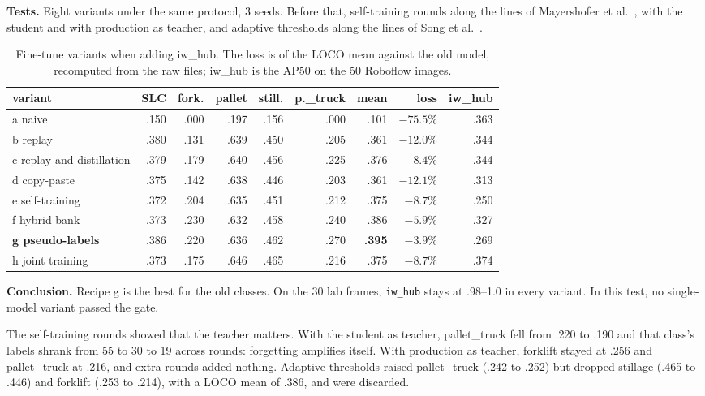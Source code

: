 \documentclass[11pt,a4paper]{article}
\newcommand{\tests}{\noindent\textbf{Tests.} }
\newcommand{\conclusion}{\noindent\textbf{Conclusion.} }
\begin{document}
\tests Eight variants under the same protocol, 3 seeds. Before that,
self-training rounds along the lines of Mayershofer et al.~\cite{selftraining},
with the student and with production as teacher, and adaptive thresholds along the
lines of Song et al.~\cite{apple}.

\begin{table}[H]
\centering\small
\caption{Fine-tune variants when adding iw\_hub. The loss is of the LOCO mean
against the old model, recomputed from the raw files; iw\_hub is the AP50 on the 50
Roboflow images.}
\label{tab:baselines}
\setlength{\tabcolsep}{4pt}
\begin{tabular}{lrrrrrrrr}
\toprule
variant & SLC & fork. & pallet & still. & p.\_truck & mean & loss & iw\_hub \\
\midrule
a naive & .150 & .000 & .197 & .156 & .000 & .101 & $-75.5\%$ & .363 \\
b replay & .380 & .131 & .639 & .450 & .205 & .361 & $-12.0\%$ & .344 \\
c replay and distillation & .379 & .179 & .640 & .456 & .225 & .376 & $-8.4\%$ & .344 \\
d copy-paste & .375 & .142 & .638 & .446 & .203 & .361 & $-12.1\%$ & .313 \\
e self-training & .372 & .204 & .635 & .451 & .212 & .375 & $-8.7\%$ & .250 \\
f hybrid bank & .373 & .230 & .632 & .458 & .240 & .386 & $-5.9\%$ & .327 \\
\textbf{g pseudo-labels} & .386 & .220 & .636 & .462 & .270 & \textbf{.395} & $\mathbf{-3.9\%}$ & .269 \\
h joint training & .373 & .175 & .646 & .465 & .216 & .375 & $-8.7\%$ & .374 \\
\bottomrule
\end{tabular}
\end{table}

\conclusion Recipe g is the best for the old classes. On the 30 lab frames,
\texttt{iw\_hub} stays at .98--1.0 in every variant. In this test, no single-model
variant passed the gate.

The self-training rounds showed that the teacher matters. With the student as
teacher, pallet\_truck fell from .220 to .190 and that class's labels shrank from
55 to 30 to 19 across rounds: forgetting amplifies itself. With production as
teacher, forklift stayed at .256 and pallet\_truck at .216, and extra rounds added
nothing. Adaptive thresholds raised pallet\_truck (.242 to .252) but dropped
stillage (.465 to .446) and forklift (.253 to .214), with a LOCO mean of .386, and
were discarded.
\end{document}

